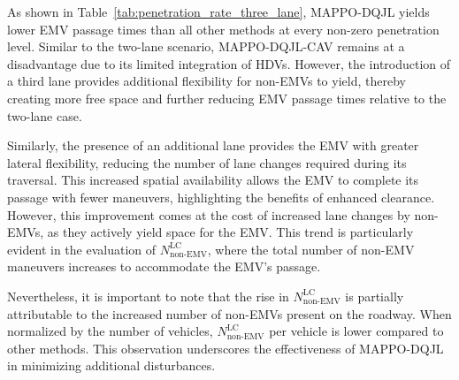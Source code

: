 As shown in Table~\ref{tab:penetration_rate_three_lane}, MAPPO-DQJL yields lower EMV passage times than all other methods at every non-zero penetration level. Similar to the two-lane scenario, MAPPO-DQJL-CAV remains at a disadvantage due to its limited integration of HDVs. However, the introduction of a third lane provides additional flexibility for non-EMVs to yield, thereby creating more free space and further reducing EMV passage times relative to the two-lane case.

Similarly, the presence of an additional lane provides the EMV with greater lateral flexibility, reducing the number of lane changes required during its traversal. This increased spatial availability allows the EMV to complete its passage with fewer maneuvers, highlighting the benefits of enhanced clearance. However, this improvement comes at the cost of increased lane changes by non-EMVs, as they actively yield space for the EMV. This trend is particularly evident in the evaluation of $N_{\text{non-EMV}}^{\text{LC}}$, where the total number of non-EMV maneuvers increases to accommodate the EMV’s passage. 

Nevertheless, it is important to note that the rise in $N_{\text{non-EMV}}^{\text{LC}}$ is partially attributable to the increased number of non-EMVs present on the roadway. When normalized by the number of vehicles, $N_{\text{non-EMV}}^{\text{LC}}$ per vehicle is lower compared to other methods. This observation underscores the effectiveness of MAPPO-DQJL in minimizing additional disturbances.


